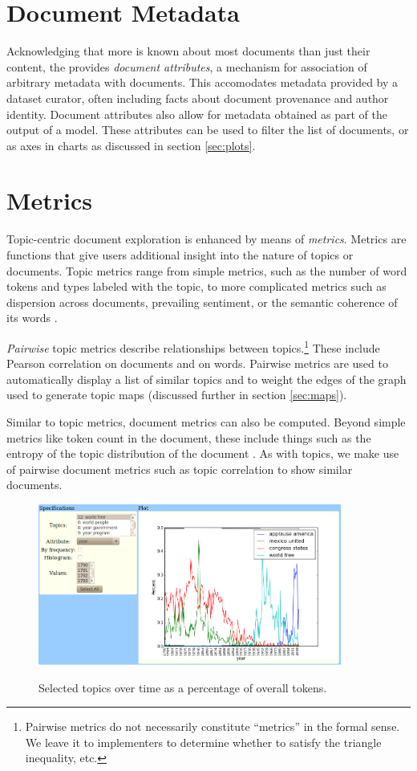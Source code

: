 \documentclass[11pt]{article}
\begin{document}
\section{Document Metadata}
Acknowledging that more is known about most documents than just their content,
the \tool{} provides \textit{document attributes}, a mechanism for association
of arbitrary metadata with documents. This accomodates metadata
provided by a dataset curator, often including facts about document
provenance and author identity. Document attributes also allow for metadata
obtained as part of the output of a model. These attributes can be used to
filter the list of documents, or as axes in charts as discussed in section \ref{sec:plots}.

\section{Metrics}
Topic-centric document exploration is enhanced by means of \textit{metrics}.
Metrics are functions that give users additional insight into the nature of
topics or documents. Topic metrics range from
simple metrics, such as the number of word tokens and types labeled with the
topic, to more complicated metrics such as dispersion across documents,
prevailing sentiment, or the semantic coherence of its words \cite{Newman2010a}.

\textit{Pairwise} topic metrics describe relationships between
topics.\footnote{Pairwise metrics do not necessarily constitute
``metrics'' in the formal sense. We leave it to implementers to determine
whether to satisfy the triangle inequality, etc.} These include Pearson correlation on documents and on words.
Pairwise metrics are used to automatically display a list of similar topics and to weight
the edges of the graph used to generate topic maps (discussed further in section
\ref{sec:maps}).

Similar to topic metrics, document metrics can also be computed.
Beyond simple metrics like token count in the document, these include
things such as the entropy of the topic distribution of the document \cite{Misra2008}. As
with topics, we make use of pairwise document metrics such as topic
correlation \cite{Blei2009} to show similar documents.

\begin{figure}[t]
 \centering
 \includegraphics[height=200px,keepaspectratio=true]{./topics_vs_years.png}
 \label{fig:chart}
 \caption{Selected topics over time as a percentage of overall tokens.}
\end{figure}
\end{document}
